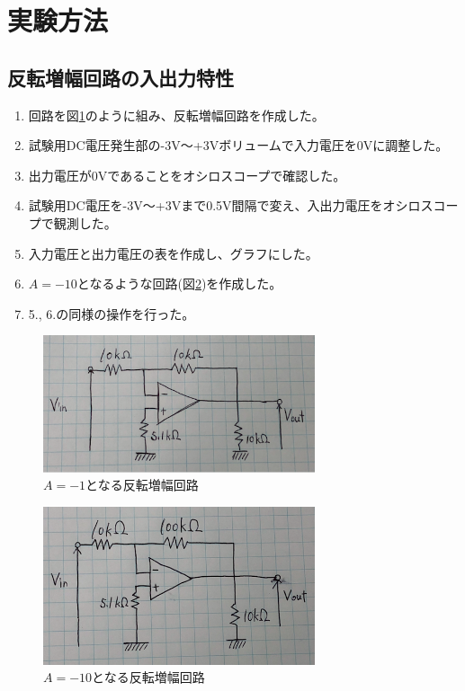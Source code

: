 \documentclass[a4paper,11pt,uplatex]{jsarticle}
\begin{document}
\section{実験方法}
\subsection{反転増幅回路の入出力特性}
\begin{enumerate}
  \item 回路を図\ref{A=-1}のように組み、反転増幅回路を作成した。
  \item 試験用DC電圧発生部の-3V〜+3Vボリュームで入力電圧を0Vに調整した。
  \item 出力電圧が0Vであることをオシロスコープで確認した。
  \item 試験用DC電圧を-3V〜+3Vまで0.5V間隔で変え、入出力電圧をオシロスコープで観測した。
  \item 入力電圧と出力電圧の表を作成し、グラフにした。
  \item $A=−10$となるような回路(図\ref{A=-10})を作成した。
  \item 5., 6.の同様の操作を行った。
\end{enumerate}

\begin{figure}[H]
	\begin{center}
		\includegraphics[width=8cm]{画像/A=-1.png}
		\caption{$A=-1$となる反転増幅回路}
		\label{A=-1}
	\end{center}
\end{figure}

\begin{figure}[H]
	\begin{center}
		\includegraphics[width=8cm]{画像/A=-10.png}
		\caption{$A=-10$となる反転増幅回路}
		\label{A=-10}
	\end{center}
\end{figure}
\end{document}
